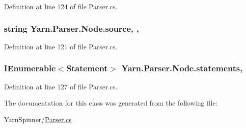 Definition at line 124 of file Parser.\-cs.

\hypertarget{a00128_a005a6b0f614beb77708fc5ce8fea66e1}{
\subsubsection[{source}]{\setlength{\rightskip}{0pt plus 5cm}string Yarn.\-Parser.\-Node.\-source\hspace{0.3cm}{\ttfamily [get]}, {\ttfamily [set]}, {\ttfamily [package]}}}\label{a00128_a005a6b0f614beb77708fc5ce8fea66e1}


Definition at line 121 of file Parser.\-cs.

\hypertarget{a00128_abdae3fb1c6927b38ce29b1b71a00cb12}{
\subsubsection[{statements}]{\setlength{\rightskip}{0pt plus 5cm}I\-Enumerable$<${\bf Statement}$>$ Yarn.\-Parser.\-Node.\-statements\hspace{0.3cm}{\ttfamily [get]}, {\ttfamily [package]}}}\label{a00128_abdae3fb1c6927b38ce29b1b71a00cb12}


Definition at line 127 of file Parser.\-cs.



The documentation for this class was generated from the following file\-:\begin{DoxyCompactItemize}
\item 
Yarn\-Spinner/\hyperlink{a00295}{Parser.\-cs}\end{DoxyCompactItemize}
